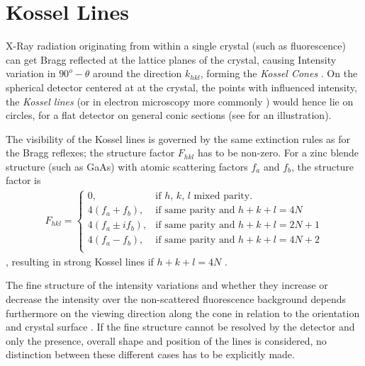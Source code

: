 


\label{chap:theory}








\section{Kossel Lines}
X-Ray radiation  originating from within a single crystal (such as fluorescence) can get Bragg reflected at the lattice planes of the crystal, causing Intensity variation in $90^o-\theta$ around the direction $k_{hkl}$, forming the \textit{Kossel Cones} \cite{cowley1995}. On the spherical detector centered at at the crystal, the points with influenced intensity, the \textit{Kossel lines} (or in electron microscopy more commonly ) would hence lie on circles, for a flat detector on general conic sections (see  for an illustration).

The visibility of the Kossel lines is governed by the same extinction rules as for the Bragg reflexes; the structure factor $F_{hkl}$ has to be non-zero. For a zinc blende structure (such as GaAs) with atomic scattering factors $f_a$ and $f_b$, the structure factor is
\begin{align}
F_{hkl} = \begin{cases}
0, & \text{if $h$, $k$, $l$ mixed parity}.\\
4(f_a+f_b), & \text{if same parity and $h+k+l = 4 N$} \\
4(f_a\pm i f_b), & \text{if same parity and $h+k+l = 2 N+1$} \\
4(f_a-f_b), & \text{if same parity and $h+k+l = 4 N+2$} \\
\end{cases}
\end{align},
resulting in strong Kossel lines if $h+k+l=4N$ \cite{reimer2013}.

The fine structure of the intensity variations and whether they increase or decrease the intensity over the non-scattered fluorescence background depends furthermore on the viewing direction along the cone in relation to the orientation and crystal surface \cite{faigel2016}. If the fine structure cannot be resolved by the detector and only the presence, overall shape and position of the lines is considered, no distinction between these different cases has to be explicitly made.

